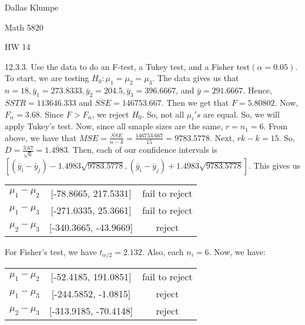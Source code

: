 \documentclass[12pt]{article}
\begin{document}
\noindent Dallas Klumpe

\noindent Math 5820

\noindent HW 14

12.3.3. Use the data to do an F-test, a Tukey test, and a Fisher test$(\alpha=0.05)$.\\
To start, we are testing $H_0:\mu_1=\mu_2=\mu_3$. The data gives us that $n=18, \bar{y}_1=273.8333, \bar{y}_2=204.5, \bar{y}_3=396.6667$, and $\bar{y}=291.6667$. Hence, $SSTR=113646.333$ and $SSE=146753.667$. Then we get that $F=5.80802$. Now, $F_{\alpha}=3.68$. Since $F>F_{\alpha}$, we reject $H_0$. So, not all $\mu_i's$ are equal. So, we will apply Tukey's test. Now, since all smaple sizes are the same, $r=n_1=6$. From above, we have that $MSE=\frac{SSE}{n-k}=\frac{146753.667}{15}=9783.5778$. Next, $rk-k=15$. So, $D=\frac{3.67}{\sqrt{6}}=1.4983$. Then, each of our confidence intervals is $[(\bar{y}_i-\bar{y}_j)-1.4983\sqrt{9783.5778}, (\bar{y}_i-\bar{y}_j)+1.4983\sqrt{9783.5778}]$. This gives us
\begin{center}
\begin{tabular}{ c   c   c  }
$\mu_1-\mu_2$ & [-78.8665, 217.5331] & fail to reject\\
$\mu_1-\mu_3$ & [-271.0335, 25.3661] & fail to reject\\
$\mu_2-\mu_3$ & [-340.3665, -43.9669] & reject
\end{tabular}
\end{center}
For Fisher's test, we have $t_{\alpha/2}=2.132$. Also, each $n_i=6$. Now, we have: 
\begin{center}
\begin{tabular}{ c   c   c  }
$\mu_1-\mu_2$ & [-52.4185, 191.0851] & fail to reject\\
$\mu_1-\mu_3$ & [-244.5852, -1.0815] & reject\\
$\mu_2-\mu_3$ & [-313.9185, -70.4148] & reject
\end{tabular}
\end{center}
\end{document}
